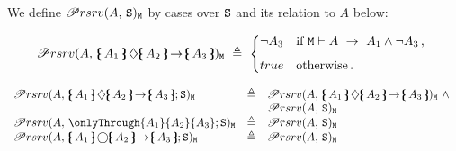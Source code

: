  \begin{definition}
We define ${\mathcal{P}rsrv( {A},\, {{\texttt{S}}{}})_{{\texttt{M}}{}}}$ by cases over ${\texttt{S}}{}$ and its relation 
to $A$  below:

 
\[
\Preserve{A} {\onlyIf{A_1}{A_2}{A_3}} {\Mod{}}   \  \triangleq \   \begin{dcases*}
\neg A_3 
   & if  $\Mod {} \vdash  A\ \rightarrow \ A_1 \wedge \neg A_3$\,, \\[1ex]
true 
   & otherwise\,.
\end{dcases*} 
\]
 
$\begin{array}{lll}
 \Preserve{A} {\onlyIf{A_1}{A_2}{A_3};\SpecB{}} {\Mod{}}   & \triangleq &   \Preserve{A} {\onlyIf{A_1}{A_2}{A_3}} {\Mod{}}  \ \wedge \  \\
 & &  \Preserve{A} {\SpecB{}} {\Mod{}}
  \\
 \Preserve{A} {\onlyThrough{A_1}{A_2}{A_3};\SpecB{}} {\Mod{}}   & \triangleq &   \Preserve{A} {\SpecB{}} {\Mod{}}
 \\
  \Preserve{A} {\onlyIfSingle{A_1}{A_2}{A_3};\SpecB{}} {\Mod{}}   & \triangleq &   \Preserve{A} {\SpecB{}} {\Mod{}}
 \\

\end{array}
$
\end{definition}

 
